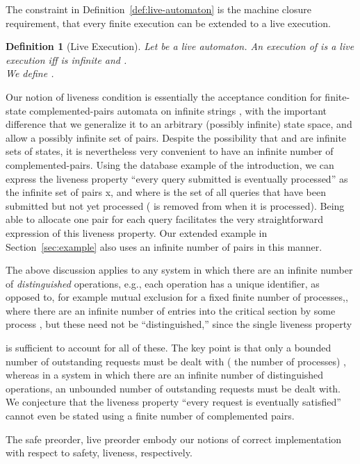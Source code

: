 \documentclass[11pt]{article}
\newcommand{\bd}{\begin{definition}}
\newcommand{\ed}{\end{definition}}
\newcommand{\intrdef}{\emph}	\newcommand{\intr}{\emph}
\newcommand{\empi}[1]{\textit{#1\/}}
\newtheorem{definition}{Definition}
\begin{document}
The constraint in Definition~\ref{def:live-automaton} is the machine
closure requirement, that every finite execution can be extended to a
live execution.



\bd[Live Execution]
\label{def:live-execution}
Let  be a live automaton. An execution  of  is a
\intrdef{live execution} iff  is infinite and .\\
We define .
\ed





Our notion of liveness condition is essentially the acceptance condition for
finite-state complemented-pairs automata on infinite strings
\cite{EL85}, with the important difference that we generalize it to an
arbitrary (possibly infinite) state space, and allow a possibly
infinite set of pairs. 
Despite the possibility that  and
 are infinite sets of states, it is nevertheless very
convenient to have an infinite number of complemented-pairs.  Using the database
example of the introduction, we can express the 
liveness property ``every query submitted is eventually processed'' as the
infinite set of pairs 
x, 
and where  is the set of all queries that have been submitted
but not yet processed ( is removed from  when it is processed).
Being able to allocate one pair for each query facilitates the very
straightforward expression of this liveness property.
Our extended example in Section~\ref{sec:example} also uses an
infinite number of pairs in this manner.

The above discussion applies to any system in which there are an infinite number
of \empi{distinguished} operations, e.g., each operation has a unique
identifier, as opposed to, for example mutual exclusion for a fixed
finite number of processes,, where there
are an infinite number of entries into the critical section by some
process , but these need not be ``distinguished,'' since the single
liveness property 

is sufficient to account for all of these. 
The key point is that only a bounded number of 
outstanding requests must be dealt with ( the number of
processes) , whereas in 
a system in which there are an infinite number
of {distinguished} operations, an unbounded number of outstanding
requests must be dealt with. We conjecture that the liveness property 
``every request is eventually satisfied'' cannot even be stated using
a finite number of complemented pairs.


The safe preorder, live preorder \cite{GSSL93} embody our notions of correct
implementation with respect to safety, liveness, respectively.
\end{document}
